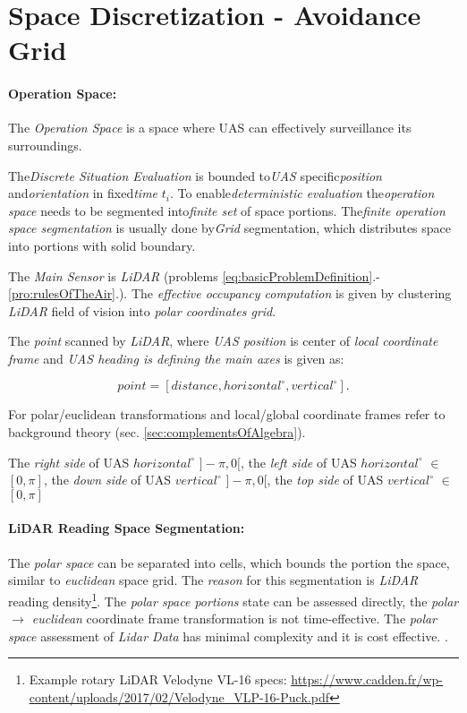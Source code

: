 \section{Space Discretization - Avoidance Grid}\label{s:AvoidanceGrid}

\paragraph{Operation Space:} The \emph{Operation Space} is a space where UAS can effectively surveillance its surroundings.

The\emph{Discrete Situation Evaluation} is bounded to\emph{UAS} specific\emph{position} and\emph{orientation} in fixed\emph{time} $t_i$. To enable\emph{deterministic evaluation} the\emph{operation space} needs to be segmented into\emph{finite set} of space portions. The\emph{finite operation space segmentation} is usually done by\emph{Grid} segmentation, which distributes space into portions with solid boundary.

The \emph{Main Sensor} is \emph{LiDAR} (problems \ref{eq:basicProblemDefinition}.-\ref{pro:rulesOfTheAir}.). The \emph{effective occupancy computation} \cite{homm2010efficient} is given by clustering \emph{LiDAR} field of vision into \emph{polar coordinates grid}.

The \emph{point} scanned by \emph{LiDAR}, where \emph{UAS position} is center of \emph{local coordinate frame} and \emph{UAS heading is defining the main axes} is given as:

\begin{equation*}
    point = [distance,horizontal^\circ,vertical^\circ].
\end{equation*}

\begin{note}
    For polar/euclidean transformations and local/global coordinate frames refer to background theory (sec. \ref{sec:complementsOfAlgebra}). 
    
    The \emph{right side} of UAS $horizontal^\circ$ $]-\pi,0[$, the \emph{left side} of UAS $horizontal^\circ$ $\in$ $[0,\pi]$, the \emph{down side} of UAS $vertical^\circ$ $]-\pi,0[$, the \emph{top side} of UAS $vertical^\circ$ $\in$ $[0,\pi]$
\end{note}

\paragraph{LiDAR Reading Space Segmentation:} The \emph{polar space} can be separated into cells, which bounds the portion the space, similar to \emph{euclidean} space grid. The \emph{reason} for this segmentation is \emph{LiDAR} reading density\footnote{Example rotary LiDAR Velodyne VL-16 specs: \url{https://www.cadden.fr/wp-content/uploads/2017/02/Velodyne_VLP-16-Puck.pdf}}. The \emph{polar space portions} state can be assessed directly, the \emph{polar $\to$ euclidean} coordinate frame transformation is not time-effective. The \emph{polar space} assessment of \emph{Lidar Data} has minimal complexity and it is cost effective. \cite{gupta2010comparative}.

